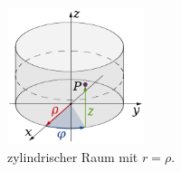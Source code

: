 

\begin{figure}
	\centering
	\includegraphics[width=4cm]{papers/geodaeten/Abbildungen/Linienelemente/LinZyl1}
	\caption{zylindrischer Raum mit $r = \rho$. \cite{geodaeten:polarkoordinaten}}
	\label{geodaeten:figure:Linienelemente:Zylinder:figure2}
	
\end{figure}